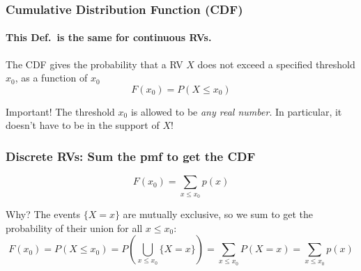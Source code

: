 \documentclass[handout]{beamer}
\begin{document}
\begin{frame}
\frametitle{Cumulative Distribution Function (CDF)}
\framesubtitle{This Def.\ is \alert{the same} for continuous RVs.}

The CDF gives the probability that a RV $X$ \alert{does not exceed} a specified threshold $x_0$, as a function of $x_0$
	$$F(x_0) = P(X \leq x_0)$$

\begin{alertblock}{Important!}
The threshold $x_0$ is allowed to be \emph{any real number}. In particular, it doesn't have to be in the support of $X$! 
\end{alertblock}

\end{frame}
\begin{frame}
\frametitle{Discrete RVs: Sum the pmf to get the CDF}
\begin{center}
	\alert{$$\boxed{F(x_0) = \sum_{x\leq x_0} p(x)}$$}
\end{center}

\small
 
\begin{block}{Why?}
The events $\{X = x\}$ are mutually exclusive, so we sum to get the probability of their union for all $x\leq x_0$:
	$$F(x_0) = P(X \leq x_0)=   P\left(\bigcup_{x\leq x_0}\{X = x\}\right) =   \sum_{x \leq x_0} P(X = x) =   \sum_{x \leq x_0} p(x)$$
\end{block}

\end{frame}


\end{document}
